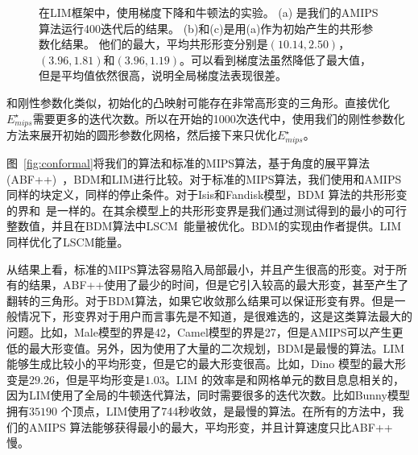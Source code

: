\begin{figure}
\centerline
{
\hfill
{}\hfill
{}
}
\caption{在LIM框架中，使用梯度下降和牛顿法的实验。 (a) 是我们的AMIPS算法运行400迭代后的结果。 (b)和(c)是用(a)作为初始产生的共形参数化结果。 他们的最大，平均共形形变分别是$(10.14, 2.50)$， $(3.96,1.81)$和$(3.96,1.19)$。可以看到梯度法虽然降低了最大值，但是平均值依然很高，说明全局梯度法表现很差。 }
\label{fig:newton}
\vspace{-5mm}
\end{figure}

和刚性参数化类似，初始化的凸映射可能存在非常高形变的三角形。直接优化$E_{mips}^{\star}$需要更多的迭代次数。所以在开始的1000次迭代中，使用我们的刚性参数化方法来展开初始的圆形参数化网格，然后接下来只优化$E_{mips}^{\star}$。

图~\ref{fig:conformal}将我们的算法和标准的MIPS算法，基于角度的展平算法(ABF++)~\cite{Sheffer2005}，BDM和LIM进行比较。对于标准的MIPS算法，我们使用和AMIPS同样的块定义，同样的停止条件。对于Isis和Fandisk模型，BDM 算法的共形形变的界和~\cite{Lipman2012}是一样的。在其余模型上的共形形变界是我们通过测试得到的最小的可行整数值，并且在BDM算法中LSCM~\cite{Levy2002}能量被优化。BDM的实现由作者提供。LIM同样优化了LSCM能量。

从结果上看，标准的MIPS算法容易陷入局部最小，并且产生很高的形变。对于所有的结果，ABF++使用了最少的时间，但是它引入较高的最大形变，甚至产生了翻转的三角形。对于BDM算法，如果它收敛那么结果可以保证形变有界。但是一般情况下，形变界对于用户而言事先是不知道，是很难选的，这是这类算法最大的问题。比如，Male模型的界是42，Camel模型的界是27，但是AMIPS可以产生更低的最大形变值。另外，因为使用了大量的二次规划，BDM是最慢的算法。LIM能够生成比较小的平均形变，但是它的最大形变很高。比如，Dino 模型的最大形变是$29.26$，但是平均形变是$1.03$。LIM 的效率是和网格单元的数目息息相关的，因为LIM使用了全局的牛顿迭代算法，同时需要很多的迭代次数。比如Bunny模型拥有$35190$ 个顶点，LIM使用了744秒收敛，是最慢的算法。在所有的方法中，我们的AMIPS 算法能够获得最小的最大，平均形变，并且计算速度只比ABF++ 慢。

